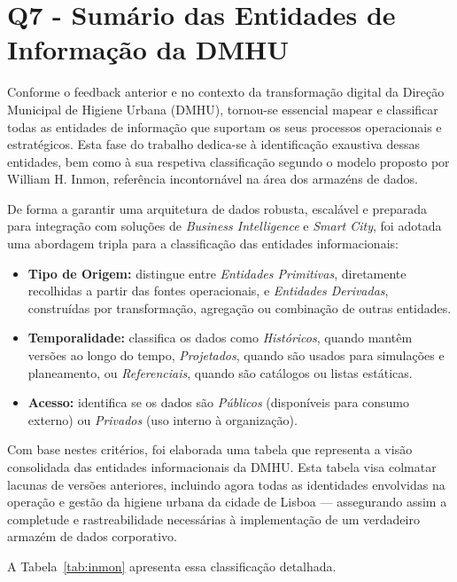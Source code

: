 \documentclass[12pt,a4paper,final]{article}
\begin{document}
    \section*{Q7 - Sumário das Entidades de Informação da DMHU}

    Conforme o feedback anterior e no contexto da transformação digital da Direção Municipal de Higiene Urbana (DMHU), tornou-se essencial mapear e classificar todas as entidades de informação que suportam os seus processos operacionais e estratégicos.
    Esta fase do trabalho dedica-se à identificação exaustiva dessas entidades, bem como à sua respetiva classificação segundo o modelo proposto por William H. Inmon, referência incontornável na área dos armazéns de dados.

    De forma a garantir uma arquitetura de dados robusta, escalável e preparada para integração com soluções de \textit{Business Intelligence} e \textit{Smart City}, foi adotada uma abordagem tripla para a classificação das entidades informacionais:
    \begin{itemize}
        \item \textbf{Tipo de Origem:} distingue entre \textit{Entidades Primitivas}, diretamente recolhidas a partir das fontes operacionais, e \textit{Entidades Derivadas}, construídas por transformação, agregação ou combinação de outras entidades.
        \item \textbf{Temporalidade:} classifica os dados como \textit{Históricos}, quando mantêm versões ao longo do tempo, \textit{Projetados}, quando são usados para simulações e planeamento, ou \textit{Referenciais}, quando são catálogos ou listas estáticas.
        \item \textbf{Acesso:} identifica se os dados são \textit{Públicos} (disponíveis para consumo externo) ou \textit{Privados} (uso interno à organização).
    \end{itemize}

    Com base nestes critérios, foi elaborada uma tabela que representa a visão consolidada das entidades informacionais da DMHU. Esta tabela visa colmatar lacunas de versões anteriores, incluindo agora todas as identidades envolvidas na operação e gestão da higiene urbana da cidade de Lisboa — assegurando assim a completude e rastreabilidade necessárias à implementação de um verdadeiro armazém de dados corporativo.

    A Tabela~\ref{tab:inmon} apresenta essa classificação detalhada.
\end{document}
